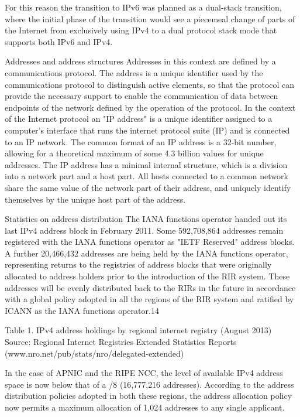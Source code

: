 \documentclass[11pt]{report}
\begin{document}
For this reason the transition to IPv6 was planned as a dual-stack transition, where the initial
phase of the transition would see a piecemeal change of parts of the Internet from exclusively using IPv4 to a dual protocol stack mode that supports both IPv6 and IPv4.

Addresses and address structures
Addresses in this context are defined by a communications protocol. The address is a unique
identifier used by the communications protocol to distinguish active elements, so that the protocol can
provide the necessary support to enable the communication of data between endpoints of the network
defined by the operation of the protocol.
In the context of the Internet protocol an "IP address" is a unique identifier assigned to a
computer's interface that runs the internet protocol suite (IP) and is connected to an IP network. The
common format of an IP address is a 32-bit number, allowing for a theoretical maximum of some
4.3 billion values for unique addresses.
The IP address has a minimal internal structure, which is a division into a network part and a host
part. All hosts connected to a common network share the same value of the network part of their address,
and uniquely identify themselves by the unique host part of the address.

Statistics on address distribution
The IANA functions operator handed out its last IPv4 address block in February 2011. Some
592,708,864 addresses remain registered with the IANA functions operator as "IETF Reserved" address
blocks. A further 20,466,432 addresses are being held by the IANA functions operator, representing
returns to the registries of address blocks that were originally allocated to address holders prior to the
introduction of the RIR system. These addresses will be evenly distributed back to the RIRs in the future in
accordance with a global policy adopted in all the regions of the RIR system and ratified by ICANN as the
IANA functions operator.14

Table 1. IPv4 address holdings by regional internet registry (August 2013)
Source: Regional Internet Registries Extended Statistics Reports (www.nro.net/pub/stats/nro/delegated-extended)

In the case of APNIC and the RIPE NCC, the level of available IPv4 address space is now below
that of a /8 (16,777,216 addresses). According to the address distribution policies adopted in both these
regions, the address allocation policy now permits a maximum allocation of 1,024 addresses to any single
applicant.
\end{document}
